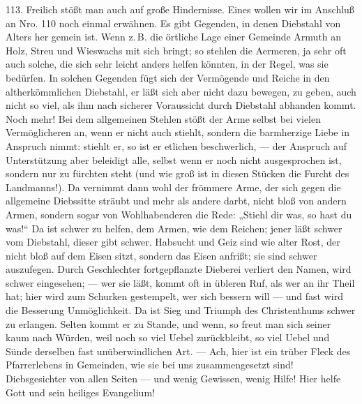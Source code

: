 113. Freilich stößt man auch auf große Hindernisse. Eines wollen wir im Anschluß an Nro. 110 noch
einmal erwähnen. Es gibt Gegenden, in denen Diebstahl von Alters her gemein ist. Wenn z.\,B. die örtliche Lage einer Gemeinde Armuth an Holz, Streu und Wieswachs mit sich bringt; so stehlen die Aermeren, ja sehr oft auch solche, die sich sehr leicht anders helfen könnten, in der Regel, was sie bedürfen. In solchen Gegenden fügt sich der Vermögende und Reiche in den altherkömmlichen Diebstahl, er läßt sich aber nicht dazu bewegen, zu geben, auch nicht so viel, als ihm nach sicherer Voraussicht durch Diebstahl abhanden kommt. Noch mehr! Bei dem allgemeinen Stehlen stößt der Arme selbst bei vielen Vermöglicheren an, wenn er nicht auch stiehlt, sondern die barmherzige Liebe in Anspruch nimmt: stiehlt er, so ist er etlichen beschwerlich, — der Anspruch auf Unterstützung aber beleidigt alle, selbst wenn er noch nicht ausgesprochen ist, sondern nur zu fürchten steht (und wie groß ist in diesen Stücken die Furcht des Landmanns!). Da vernimmt dann wohl der frömmere Arme, der sich gegen die allgemeine Diebssitte sträubt und mehr als andere darbt, nicht bloß von andern Armen, sondern sogar von Wohlhabenderen die Rede: „Stiehl dir was, so hast du was!“ Da ist schwer zu helfen, dem Armen, wie dem Reichen; jener läßt schwer vom Diebstahl, dieser gibt schwer. Habsucht und Geiz sind wie alter Rost, der nicht bloß auf dem Eisen sitzt, sondern das Eisen anfrißt; sie sind schwer auszufegen. Durch Geschlechter fortgepflanzte Dieberei verliert den Namen, wird schwer eingesehen; — wer sie läßt, kommt oft in übleren Ruf, als wer an ihr Theil hat; hier wird zum Schurken gestempelt, wer sich bessern will
— und fast wird die Besserung Unmöglichkeit. Da ist Sieg und Triumph des Christenthums schwer zu erlangen. Selten kommt er zu Stande, und wenn, so freut man sich seiner kaum nach Würden, weil noch so viel Uebel zurückbleibt, so viel Uebel und Sünde derselben fast unüberwindlichen Art. — Ach, hier ist ein trüber Fleck des Pfarrerlebens in Gemeinden, wie sie bei uns zusammengesetzt sind! Diebsgesichter von allen Seiten — und wenig Gewissen, wenig Hilfe! Hier helfe Gott und sein heiliges Evangelium!

